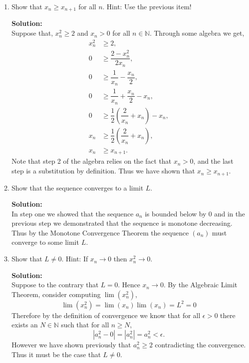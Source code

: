 \documentclass[12pt]{article}
\makeatletter
\theoremstyle{homework}
\newenvironment{exercise}[1]
{\def\@currentlabel{#1}\exercisecore}
{\endexercisecore}
\newcommand{\localhead}[1]{\par\smallskip\noindent\textbf{#1}\nobreak\\}%
\newcommand\solution{\localhead{Solution:}}
\newcommand{\Nats}{\ensuremath{\mathbb N}}
\makeatother
\begin{document}
\begin{exercise}{2.4.5 (Modified, with hints!)}
\begin{enumerate}
	\item Show that $x_n \ge x_{n+1}$ for all $n$.  Hint: Use the previous item!\\
	\solution Suppose that, $x_n^2 \geq 2$ and $x_n > 0$ for all $n \in \Nats$. Through some algebra we get,
	\begin{align*}
		x_n^2 &\geq 2,\\
		0 &\geq \dfrac{2 - x_n^2}{2x_n},\\
		0 &\geq \dfrac{1}{x_n} - \dfrac{x_n}{2},\\
		0 &\geq \dfrac{1}{x_n} + \dfrac{x_n}{2} - x_n,\\
		0 &\geq \dfrac{1}{2}\left(\dfrac{2}{x_n} + x_n\right) - x_n,\\
		x_n &\geq \dfrac{1}{2}\left(\dfrac{2}{x_n} + x_n\right),\\
		x_n &\geq x_{n+1}.
	\end{align*}
Note that step 2 of the algebra relies on the fact that $x_n > 0$, and the last step is a substitution by definition. Thus we have shown that $x_n \ge x_{n+1}$.
\vspace{.25in}




	\item Show that the sequence converges to a limit $L$.\\
	\solution In step one we showed that the sequence $a_n$ is bounded below by 0 and in the previous step we demonstrated that the sequence
	is monotone decreasing. Thus by the Monotone Convergence Theorem the sequence $(a_n)$ must converge to some limit $L$.
	\vspace{.25in}


	\item Show that $L\neq 0$. Hint: If $x_n\to 0$ then $x_n^2\to 0$.\\
	\solution Suppose to the contrary that $L = 0$. Hence $x_n\to 0$. By the Algebraic Limit Theorem, consider computing
	$\lim (x_n^2)$,
	\begin{equation*}
		\lim (x_n^2) = \lim (x_n)\lim (x_n) = L^2 = 0 
	\end{equation*}   
	Therefore by the definition of convergence we know that for all $\epsilon >0$ there exists an $N\in \Nats$ such that for all $n \geq N$,
	\begin{equation*}
		|a_n^2 - 0| = |a_n^2| = a_n^2 < \epsilon. 
	\end{equation*}
	However we have shown previously that $a_n^2 \geq 2$ contradicting the convergence. Thus it must be the case that $L \neq 0$.
	\vspace{.25in}








\end{enumerate}
\end{exercise}
\end{document}
